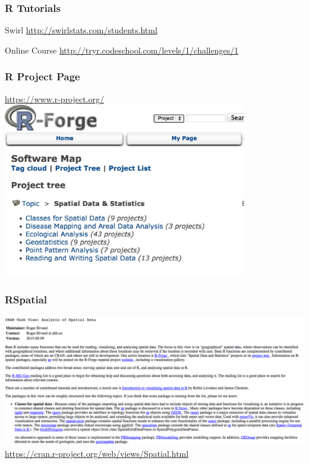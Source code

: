 \documentclass{beamer}
\begin{document}

\begin{frame}
\frametitle{R Tutorials}
\begin{block}{Swirl}
\href{http://swirlstats.com/students.html}{http://swirlstats.com/students.html}
\end{block}
\vspace{1 cm}
\begin{block}{Online Course}
\href{http://tryr.codeschool.com/levels/1/challenges/1}{http://tryr.codeschool.com/levels/1/challenges/1}
\end{block}
\end{frame}



\begin{frame}
\frametitle{R Project Page}
\href{https://www.r-project.org/}{\alert{https://www.r-project.org/}}
\vspace{0.5cm}
\centering
\includegraphics[width=0.8\textwidth]{Figures/Rforge.png}
\end{frame}


\begin{frame}
\frametitle{RSpatial}
\centering
\includegraphics[width=\textwidth]{Figures/Rspatial.png}\\
\href{https://cran.r-project.org/web/views/Spatial.html}{https://cran.r-project.org/web/views/Spatial.html}
\end{frame}
\end{document}
